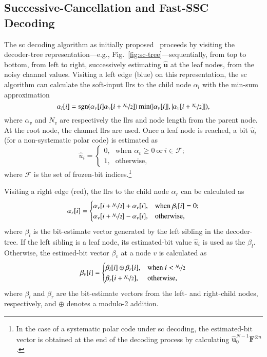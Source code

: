 \documentclass[conference]{IEEEtran}
\newcommand{\mvec}[1]{\bm{#1}}
\newcommand{\sgn}[1]{\text{sgn}(#1)}
\begin{document}
\subsection{Successive-Cancellation and Fast-SSC Decoding}\label{sec:fastssc}
The \gls{sc} decoding algorithm as initially proposed~\cite{Arikan2009} proceeds by visiting the decoder-tree representation---e.g., Fig.~\ref{fig:sc-tree}---sequentially, from top to bottom, from left to right, successively estimating $\bm{\hat{u}}$ at the leaf nodes, from the noisy channel values. Visiting a left edge (blue) on this representation, the \gls{sc} algorithm can calculate the soft-input \glspl{llr} to the child node $\alpha_l$ with the min-sum approximation \cite{Leroux2011}
\begin{equation}\label{eqn:sc:f}
\alpha_l[i] = \sgn{\alpha_v[i]\alpha_v[i + \nicefrac{N_v}{2}]} \min(|\alpha_v[i]|, |\alpha_v[i + \nicefrac{N_v}{2}]|),
\end{equation}
where $\alpha_v$ and $N_v$ are respectively the \glspl{llr} and node length from the parent node. At the root node, the channel \glspl{llr} are used. Once a leaf node is reached, a bit $\hat{u}_i$ (for a non-systematic polar code) is estimated as
\begin{equation}\label{eqn:sc:estu}
\hat{u}_i = \begin{cases}
0\text{,} & \text{when } \alpha_v \geq 0~\text{or}~i \in \mathcal{F};\\
1\text{,} & \text{otherwise,}
\end{cases}
\end{equation}
where $\mathcal{F}$ is the set of frozen-bit indices.\footnote{In the case of a systematic polar code under \gls{sc} decoding, the estimated-bit vector is obtained at the end of the decoding process by calculating $\mvec{\hat{u}}_0^{N-1}\mvec{F}^{\otimes n}$.}

Visiting a right edge (red), the \glspl{llr} to the child node $\alpha_r$ can be calculated \cite{Leroux2011} as
\begin{equation}\label{eqn:sc:g}
\alpha_r[i] = \begin{cases}
\alpha_v[i + \nicefrac{N_v}{2}] + \alpha_v[i]\text{,} & \text{when } \beta_l[i] = 0;\\
\alpha_v[i + \nicefrac{N_v}{2}] - \alpha_v[i]\text{,} & \text{otherwise},
\end{cases}
\end{equation}
where $\beta_l$ is the bit-estimate vector generated by the left sibling in the decoder-tree. If the left sibling is a leaf node, its estimated-bit value $\hat{u}_i$ is used as the $\beta_l$. Otherwise, the estimed-bit vector $\beta_v$ at a node $v$ is calculated as
\begin{equation}
\beta_v[i] =
  \begin{cases}
    \beta_l[i]\oplus \beta_r[i], & \text{when}~i < \nicefrac{N_v}{2}\\
    \beta_r[i+\nicefrac{N_v}{2}], & \text{otherwise},
  \end{cases}
  \label{eq4}
\end{equation}
where $\beta_l$ and $\beta_r$ are the bit-estimate vectors from the left- and right-child nodes, respectively, and $\oplus$ denotes a modulo-2 addition.
\end{document}
